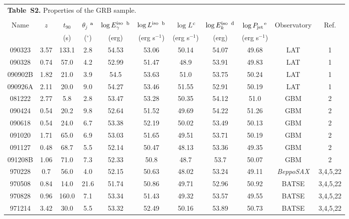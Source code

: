 \documentclass[12pt]{article}
\begin{document}
\clearpage


\begin{landscape}
\begin{longtable}{ccccccccccc}
\multicolumn{11}{l}{{\bf Table~S2.} Properties of the GRB sample.} \\
\\
\hline\hline
Name & $z$ & $t_{90}$ & $\theta_j$ $^{\rm a}$ & $\log E_\gamma^{\rm iso}$ $^{\rm b}$ & $\log L^{\rm iso}$ $^{\rm b}$ & $\log L$$^{\rm c}$ & $\log E_k^{\rm iso}$ $^{\rm d}$ & $\log P_{\rm jet}$$^{\rm e}$ & Observatory & Ref. \\
 &  & (s) & ($^\circ$) & (erg) & (erg s$^{-1}$) & (erg s$^{-1}$) & (erg) & (erg s$^{-1}$) &  &  \\
 \hline
090323 & 3.57 & 133.1 & 2.8 & 54.53 & 53.06 & 50.14 & 54.07 & 49.68 & LAT & 1 \\
090328 & 0.74 & 57.0 & 4.2 & 52.99 & 51.47 & 48.9 & 53.91 & 49.83 & LAT & 1 \\
090902B & 1.82 & 21.0 & 3.9 & 54.5 & 53.63 & 51.0 & 53.75 & 50.24 & LAT & 1 \\
090926A & 2.11 & 20.0 & 9.0 & 54.27 & 53.46 & 51.55 & 52.91 & 50.19 & LAT & 1 \\
081222 & 2.77 & 5.8 & 2.8 & 53.47 & 53.28 & 50.35 & 54.12 & 51.0 & GBM & 2 \\
090424 & 0.54 & 20.2 & 9.8 & 52.64 & 51.52 & 49.69 & 54.22 & 51.26 & GBM & 2 \\
090618 & 0.54 & 24.0 & 6.7 & 53.38 & 52.19 & 50.02 & 53.49 & 50.13 & GBM & 2 \\
091020 & 1.71 & 65.0 & 6.9 & 53.03 & 51.65 & 49.51 & 53.71 & 50.19 & GBM & 2 \\
091127 & 0.48 & 68.7 & 5.5 & 52.14 & 50.47 & 48.13 & 53.36 & 49.35 & GBM & 2 \\
091208B & 1.06 & 71.0 & 7.3 & 52.33 & 50.8 & 48.7 & 53.7 & 50.07 & GBM & 2 \\
970228 & 0.7 & 56.0 & 4.0 & 52.15 & 50.63 & 48.02 & 53.24 & 49.11 & \textit{BeppoSAX} & 3,4,5,22 \\
970508 & 0.84 & 14.0 & 21.6 & 51.74 & 50.86 & 49.71 & 52.96 & 50.92 & BATSE & 3,4,5,22 \\
970828 & 0.96 & 160.0 & 7.1 & 53.34 & 51.43 & 49.32 & 53.57 & 49.55 & BATSE & 3,4,5,22 \\
971214 & 3.42 & 30.0 & 5.5 & 53.32 & 52.49 & 50.16 & 53.89 & 50.73 & BATSE & 3,4,5,22 \\

\end{longtable}
\end{landscape}
\end{document}
